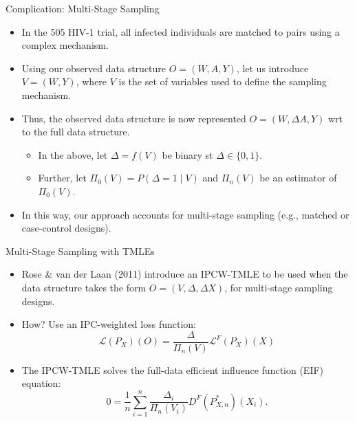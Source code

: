 \documentclass[12pt,t,handout]{beamer}
\newcommand{\lik}{\mathcal{L}}
\begin{document}
\begin{frame}[c]{Complication: Multi-Stage Sampling}

\begin{center}
\begin{itemize}
  \itemsep10pt
  \item In the 505 HIV-1 trial, all infected individuals are matched to pairs
    using a complex mechanism.
  \item Using our observed data structure $O = (W,A,Y)$, let us introduce $V =
    (W,Y)$, where $V$ is the set of variables used to define the sampling
    mechanism.
  \item Thus, the observed data structure is now represented $O = (W, \Delta A,
    Y)$ wrt to the full data structure.
    \begin{itemize}
      \item In the above, let $\Delta = f(V)$ be binary st $\Delta \in \{0,
        1\}$.
      \item Further, let $\Pi_0(V) = P(\Delta = 1 \mid V)$ and $\Pi_n(V)$ be an
        estimator of $\Pi_0(V)$.
    \end{itemize}
  \item In this way, our approach accounts for multi-stage sampling (e.g.,
    matched or case-control designs).
\end{itemize}
\end{center}

\note{
}

\end{frame}


\begin{frame}[c]{Multi-Stage Sampling with TMLEs}

\begin{center}
\begin{itemize}
  \itemsep10pt
  \item Rose \& van der Laan (2011) introduce an IPCW-TMLE to be used when the
    data structure takes the form $O = (V, \Delta, \Delta X)$, for multi-stage
    sampling designs.
  \item How? Use an IPC-weighted loss function:
    \[
      \lik(P_X)(O) = \frac{\Delta}{\Pi_n(V)}\lik^F(P_X)(X)
    \]
  \item The IPCW-TMLE solves the full-data efficient influence function (EIF)
    equation:
    \[
      0 = \frac{1}{n}\sum_{i = 1}^n
      \frac{\Delta_i}{\Pi_n(V_i)}D^F(P^*_{X,n})(X_i).
    \]
\end{itemize}
\end{center}


\end{frame}
\end{document}
